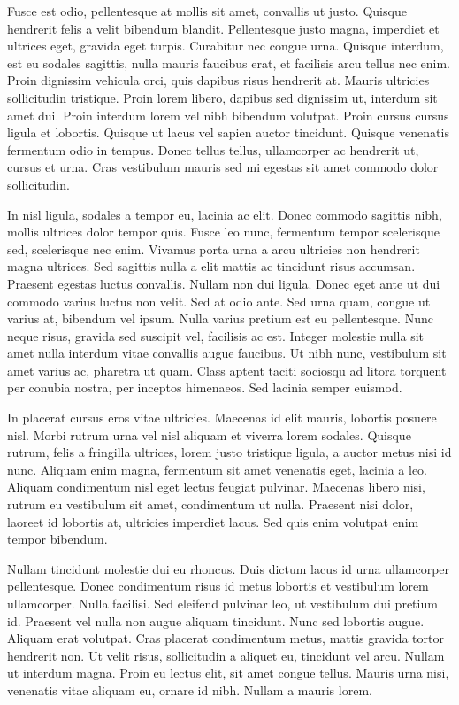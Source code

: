 Fusce est odio, pellentesque at mollis sit amet, convallis ut justo. Quisque hendrerit felis a velit bibendum blandit.
Pellentesque justo magna, imperdiet et ultrices eget, gravida eget turpis. Curabitur nec congue urna. Quisque interdum,
est eu sodales sagittis, nulla mauris faucibus erat, et facilisis arcu tellus nec enim. Proin dignissim vehicula orci,
quis dapibus risus hendrerit at. Mauris ultricies sollicitudin tristique. Proin lorem libero, dapibus sed dignissim ut,
interdum sit amet dui. Proin interdum lorem vel nibh bibendum volutpat. Proin cursus cursus ligula et lobortis. Quisque
ut lacus vel sapien auctor tincidunt. Quisque venenatis fermentum odio in tempus. Donec tellus tellus, ullamcorper ac
hendrerit ut, cursus et urna. Cras vestibulum mauris sed mi egestas sit amet commodo dolor sollicitudin.

In nisl ligula, sodales a tempor eu, lacinia ac elit. Donec commodo sagittis nibh, mollis ultrices dolor tempor quis.
Fusce leo nunc, fermentum tempor scelerisque sed, scelerisque nec enim. Vivamus porta urna a arcu ultricies non
hendrerit magna ultrices. Sed sagittis nulla a elit mattis ac tincidunt risus accumsan. Praesent egestas luctus
convallis. Nullam non dui ligula. Donec eget ante ut dui commodo varius luctus non velit. Sed at odio ante. Sed urna
quam, congue ut varius at, bibendum vel ipsum. Nulla varius pretium est eu pellentesque. Nunc neque risus, gravida sed
suscipit vel, facilisis ac est. Integer molestie nulla sit amet nulla interdum vitae convallis augue faucibus. Ut nibh
nunc, vestibulum sit amet varius ac, pharetra ut quam. Class aptent taciti sociosqu ad litora torquent per conubia
nostra, per inceptos himenaeos. Sed lacinia semper euismod.

In placerat cursus eros vitae ultricies. Maecenas id elit mauris, lobortis posuere nisl. Morbi rutrum urna vel nisl
aliquam et viverra lorem sodales. Quisque rutrum, felis a fringilla ultrices, lorem justo tristique ligula, a auctor
metus nisi id nunc. Aliquam enim magna, fermentum sit amet venenatis eget, lacinia a leo. Aliquam condimentum nisl eget
lectus feugiat pulvinar. Maecenas libero nisi, rutrum eu vestibulum sit amet, condimentum ut nulla. Praesent nisi dolor,
laoreet id lobortis at, ultricies imperdiet lacus. Sed quis enim volutpat enim tempor bibendum.

Nullam tincidunt molestie dui eu rhoncus. Duis dictum lacus id urna ullamcorper pellentesque. Donec condimentum risus id
metus lobortis et vestibulum lorem ullamcorper. Nulla facilisi. Sed eleifend pulvinar leo, ut vestibulum dui pretium id.
Praesent vel nulla non augue aliquam tincidunt. Nunc sed lobortis augue. Aliquam erat volutpat. Cras placerat
condimentum metus, mattis gravida tortor hendrerit non. Ut velit risus, sollicitudin a aliquet eu, tincidunt vel arcu.
Nullam ut interdum magna. Proin eu lectus elit, sit amet congue tellus. Mauris urna nisi, venenatis vitae aliquam eu,
ornare id nibh. Nullam a mauris lorem.

